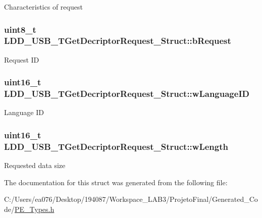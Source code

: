 Characteristics of request \hypertarget{struct_l_d_d___u_s_b___t_get_decriptor_request___struct_aa7651472aa5110086f335c0b79c0bc5b}{
\subsubsection[{b\-Request}]{\setlength{\rightskip}{0pt plus 5cm}uint8\-\_\-t L\-D\-D\-\_\-\-U\-S\-B\-\_\-\-T\-Get\-Decriptor\-Request\-\_\-\-Struct\-::b\-Request}}\label{struct_l_d_d___u_s_b___t_get_decriptor_request___struct_aa7651472aa5110086f335c0b79c0bc5b}
Request I\-D \hypertarget{struct_l_d_d___u_s_b___t_get_decriptor_request___struct_a228c41af26c45c1fa18d964c0702a4b4}{
\subsubsection[{w\-Language\-I\-D}]{\setlength{\rightskip}{0pt plus 5cm}uint16\-\_\-t L\-D\-D\-\_\-\-U\-S\-B\-\_\-\-T\-Get\-Decriptor\-Request\-\_\-\-Struct\-::w\-Language\-I\-D}}\label{struct_l_d_d___u_s_b___t_get_decriptor_request___struct_a228c41af26c45c1fa18d964c0702a4b4}
Language I\-D \hypertarget{struct_l_d_d___u_s_b___t_get_decriptor_request___struct_af9ac7409b4031aa6f3ec5da9d79b06eb}{
\subsubsection[{w\-Length}]{\setlength{\rightskip}{0pt plus 5cm}uint16\-\_\-t L\-D\-D\-\_\-\-U\-S\-B\-\_\-\-T\-Get\-Decriptor\-Request\-\_\-\-Struct\-::w\-Length}}\label{struct_l_d_d___u_s_b___t_get_decriptor_request___struct_af9ac7409b4031aa6f3ec5da9d79b06eb}
Requested data size 

The documentation for this struct was generated from the following file\-:\begin{DoxyCompactItemize}
\item 
C\-:/\-Users/ea076/\-Desktop/194087/\-Workspace\-\_\-\-L\-A\-B3/\-Projeto\-Final/\-Generated\-\_\-\-Code/\hyperlink{_p_e___types_8h}{P\-E\-\_\-\-Types.\-h}\end{DoxyCompactItemize}
